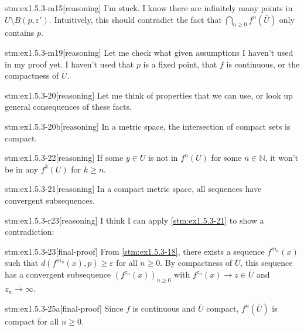 \begin{stm}{stm:ex1.5.3-m15}[reasoning]
I'm stuck. I know there are infinitely many points in $U \setminus B(p, \varepsilon')$. Intuitively, this should contradict the fact that $\bigcap_{n \ge 0} f^n(\overline{U})$ only contains $p$.
\end{stm}

\begin{stm}{stm:ex1.5.3-m19}[reasoning]
Let me check what given assumptions I haven't used in my proof yet. I haven't used that $p$ is a fixed point, that $f$ is continuous, or the compactness of $\overline{U}$.
\end{stm}

\begin{stm}{stm:ex1.5.3-20}[reasoning]
Let me think of properties that we can use, or look up general consequences of these facts.
\end{stm}

\begin{stm}{stm:ex1.5.3-20b}[reasoning]
 In a metric space, the intersection of compact sets is compact.
\end{stm}

\begin{stm}{stm:ex1.5.3-22}[reasoning]
    If some $y \in U$ is not in $f^n(U)$ for some $n \in \mathbb{N}$, it won't be in any $f^k(U)$ for $k \ge n$.
\end{stm}

\begin{stm}{stm:ex1.5.3-21}[reasoning]
In a compact metric space, all sequences have convergent subsequences.
\end{stm}

\begin{stm}{stm:ex1.5.3-r23}[reasoning]
I think I can apply \ref{stm:ex1.5.3-21} to show a contradiction: 
\end{stm}

\begin{stm}{stm:ex1.5.3-23}[final-proof]
From \ref{stm:ex1.5.3-18}, there exists a sequence $f^{m_n}(x)$ such that $d(f^{m_n}(x), p) \ge \varepsilon$ for all $n \ge 0$. By compactness of $\overline{U}$, this sequence has a convergent subsequence $(f^{z_n}(x))_{n \ge 0}$ with $f^{z_n}(x) \to z \in \overline{U}$ and $z_n \to \infty$.
\end{stm}

\begin{stm}{stm:ex1.5.3-25a}[final-proof]
Since $f$ is continuous and $\overline{U}$ compact, $f^n(\overline{U})$ is compact for all $n \ge 0$. 
\end{stm}

